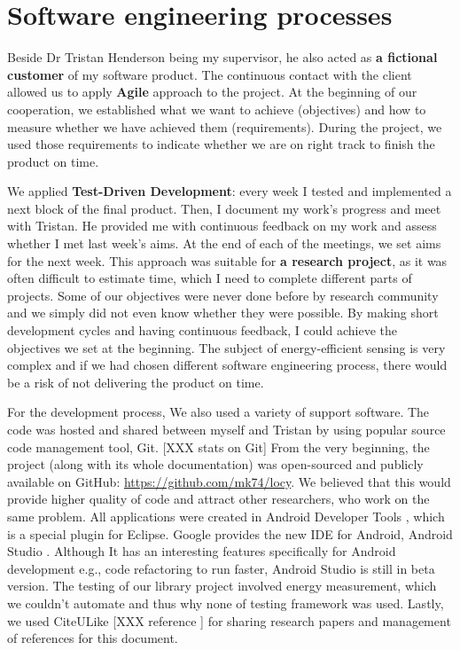 \section{Software engineering processes}
\label{s:processes}
\hspace{10pt} Beside Dr Tristan Henderson being my supervisor, he also acted as \textbf{a fictional customer} of my software product. The continuous contact with the client allowed us to apply \textbf{Agile} approach to the project. At the beginning of our cooperation,  we established what we want to achieve (objectives) and how to measure whether we have achieved them (requirements). During the project, we used those requirements to indicate whether we are on right track to finish the product on time.

We applied \textbf{Test-Driven Development}: every week I tested and implemented a next block of the final product. Then, I document my work's progress and meet with Tristan. He provided me with continuous feedback on my work and assess whether I met last week's aims. At the end of each of the meetings, we set aims for the next week. This approach was suitable for \textbf{a research project}, as it was often difficult to estimate time, which I need to complete different parts of projects. Some of our objectives were never done before by research community and we simply did not even know whether they were possible. By making short development cycles and having continuous feedback, I could achieve the objectives we set at the beginning. The subject of energy-efficient sensing is very complex and if we had chosen different software engineering process, there would be a risk of not delivering the product on time. 
			
For the development process, We also used a variety of support software. The code was hosted and shared between myself and Tristan by using popular source code management tool, Git. [XXX stats on Git] From the very beginning, the project (along with its whole documentation) was open-sourced and publicly available on GitHub: \url{https://github.com/mk74/locy}. We believed that this would provide higher quality of code and attract other researchers, who work on the same problem. All applications were created in Android Developer Tools \cite{google:adt}, which is a special plugin for Eclipse. Google provides the new IDE for Android, Android Studio \cite{google:androidstudio}. Although It has an interesting features specifically for Android development e.g., code refactoring to run faster, Android Studio is still in beta version. The testing of our library project involved energy measurement, which we couldn't automate and thus why none of testing framework was used. Lastly, we used CiteULike [XXX reference ] for sharing research papers and management of references for this document.
	